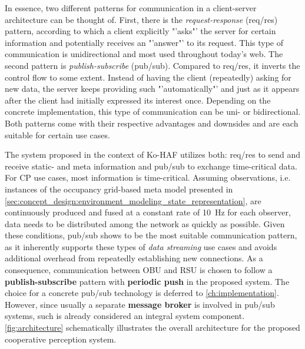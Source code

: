 In essence, two different patterns for communication in a client-server architecture can be thought of. First, there is the \textit{request-response} (req/res) pattern, according to which a client explicitly "'asks"' the server for certain information and potentially receives an "'answer"' to its request. This type of communication is unidirectional and most used throughout today's web. The second pattern is \textit{publish-subscribe} (pub/sub). Compared to req/res, it inverts the control flow to some extent. Instead of having the client (repeatedly) asking for new data, the server keeps providing such "'automatically"' and just as it appears after the client had initially expressed its interest once. Depending on the concrete implementation, this type of communication can be uni- or bidirectional. Both patterns come with their respective advantages and downsides and are each suitable for certain use cases.

The system proposed in the context of Ko-HAF \cite{Hohm2019} utilizes both: req/res to send and receive static- and meta information and pub/sub to exchange time-critical data. For CP use cases, most information is time-critical. Assuming observations, i.e. instances of the occupancy grid-based meta model presented in \cref{sec:concept_design:environment_modeling_state_representation}, are continuously produced and fused at a constant rate of \SI{10}{\hertz} for each observer, data needs to be distributed among the network as quickly as possible. Given these conditions, pub/sub shows to be the most suitable communication pattern, as it inherently supports these types of \textit{data streaming} use cases and avoids additional overhead from repeatedly establishing new connections. As a consequence, communication between OBU and RSU is chosen to follow a \textbf{publish-subscribe} pattern with \textbf{periodic push} in the proposed system. The choice for a concrete pub/sub technology is deferred to \cref{ch:implementation}. However, since usually a separate \textbf{message broker} is involved in pub/sub systems, such is already considered an integral system component. \cref{fig:architecture} schematically illustrates the overall architecture for the proposed cooperative perception system.

